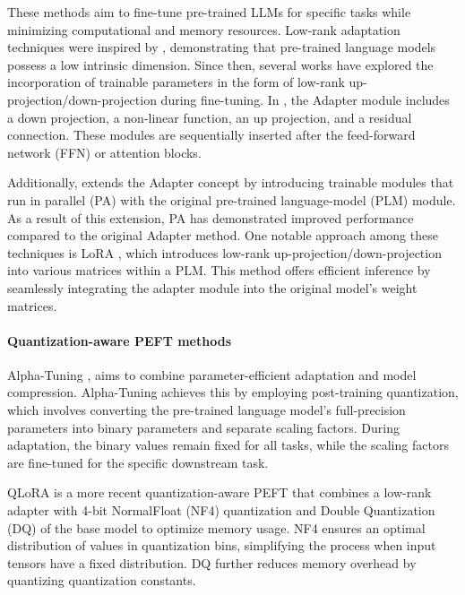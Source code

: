 \documentclass[11pt]{article}
\begin{document}
These methods aim to fine-tune pre-trained LLMs for specific tasks while minimizing computational and memory resources. Low-rank adaptation techniques were inspired by \cite{aghajanyan2020intrinsic}, demonstrating that pre-trained language models possess a low intrinsic dimension. Since then, several works have explored the incorporation of trainable parameters in the form of low-rank up-projection/down-projection during fine-tuning. In \cite{houlsby2019parameter}, the Adapter module includes a down projection, a non-linear function, an up projection, and a residual connection. These modules are sequentially inserted after the feed-forward network (FFN) or attention blocks.

Additionally, \cite{he2021towards} extends the Adapter concept by introducing trainable modules that run in parallel (PA) with the original pre-trained language-model (PLM) module. As a result of this extension, PA has demonstrated improved performance compared to the original Adapter method. One notable approach among these techniques is LoRA \cite{hu2021lora}, which introduces low-rank up-projection/down-projection into various matrices within a PLM. This method offers efficient inference by seamlessly integrating the adapter module into the original model's weight matrices.

\paragraph{Quantization-aware PEFT methods}
Alpha-Tuning \cite{kwon2022alphatuning}, aims to combine parameter-efficient adaptation and model compression. Alpha-Tuning achieves this by employing post-training quantization, which involves converting the pre-trained language model's full-precision parameters into binary parameters and separate scaling factors. During adaptation, the binary values remain fixed for all tasks, while the scaling factors are fine-tuned for the specific downstream task.






QLoRA \cite{dettmers2023qlora} is a more recent quantization-aware PEFT that combines a low-rank adapter with 4-bit NormalFloat (NF4) quantization and Double Quantization (DQ) of the base model to optimize memory usage. NF4 ensures an optimal distribution of values in quantization bins, simplifying the process when input tensors have a fixed distribution. DQ further reduces memory overhead by quantizing quantization constants. 
\end{document}
